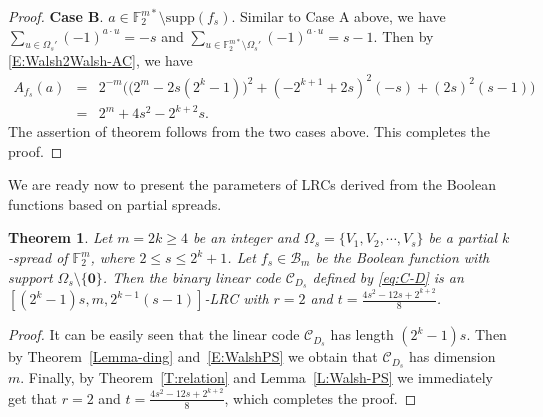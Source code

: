 \documentclass[10pt]{article}
\newtheorem{theorem}{Theorem}
\newcommand{\F}{\mathbb{F}}
\newcommand{\0}{\textbf{0}}
\newcommand{\1}{\textbf{1}}
\newcommand{\C}{{\mathcal C}}
\begin{document}
\begin{proof}
\textbf{Case B}. $a\in\F_2^{m*}\setminus\mathrm{supp}(f_s)$.
Similar to Case A above, we have
$\sum_{u\in\Omega_s'}(-1)^{a \cdot u}=-s$ and $\sum_{u\in\F_2^{m*}\setminus\Omega_s'}(-1)^{a \cdot u}=s-1$.
Then by \eqref{E:Walsh2Walsh-AC}, we have
\begin{eqnarray*}
A_{f_s}(a)&=&2^{-m}\bigg(\big(2^m-2s(2^k-1)\big)^2+(-2^{k+1}+2s)^2(-s)+(2s)^2(s-1)\bigg)\\
&=&2^m+4s^2-2^{k+2}s.
\end{eqnarray*}
The assertion of theorem follows from the two cases above. This completes the proof.
\end{proof}


We are ready now to present the parameters of LRCs
derived from the Boolean functions based on partial spreads.
\begin{theorem}\label{T:PSParameter}
Let $m=2k\geq 4$ be an integer and $\Omega_s=\{V_1,V_2,\cdots,V_s\}$ be a partial $k$-spread of $\F_2^m$,
where $2\leq s\leq 2^k+1$.
Let $f_s\in\mathcal{B}_{m}$ be the Boolean function with support $\Omega_s\setminus\{\0\}$.
Then the binary linear code $\C_{D_s}$ defined by \eqref{eq:C-D}
is an $[(2^k-1)s, m, 2^{k-1}(s-1)]$-LRC with $r=2$ and $t=\frac{4s^2-12s+2^{k+2}}{8}$.
\end{theorem}
\begin{proof}
It can be easily seen that the linear code $\C_{D_s}$ has length $(2^k-1)s$.
Then by Theorem~\ref{Lemma-ding} and~\eqref{E:WalshPS} we obtain that
$\C_{D_s}$ has dimension $m$. Finally, by Theorem~\ref{T:relation} and Lemma~\ref{L:Walsh-PS}
we immediately get that $r=2$ and $t=\frac{4s^2-12s+2^{k+2}}{8}$, which completes the proof.
\end{proof}
\end{document}
